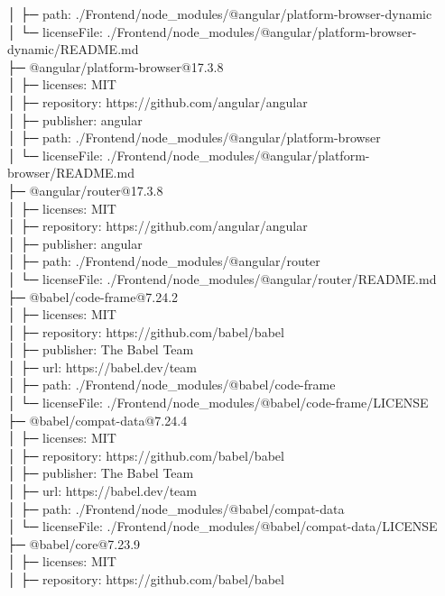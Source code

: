 │  ├─ path: ./Frontend/node\_modules/@angular/platform-browser-dynamic\\
│  └─ licenseFile: ./Frontend/node\_modules/@angular/platform-browser-dynamic/README.md\\
├─ @angular/platform-browser@17.3.8\\
│  ├─ licenses: MIT\\
│  ├─ repository: https://github.com/angular/angular\\
│  ├─ publisher: angular\\
│  ├─ path: ./Frontend/node\_modules/@angular/platform-browser\\
│  └─ licenseFile: ./Frontend/node\_modules/@angular/platform-browser/README.md\\
├─ @angular/router@17.3.8\\
│  ├─ licenses: MIT\\
│  ├─ repository: https://github.com/angular/angular\\
│  ├─ publisher: angular\\
│  ├─ path: ./Frontend/node\_modules/@angular/router\\
│  └─ licenseFile: ./Frontend/node\_modules/@angular/router/README.md\\
├─ @babel/code-frame@7.24.2\\
│  ├─ licenses: MIT\\
│  ├─ repository: https://github.com/babel/babel\\
│  ├─ publisher: The Babel Team\\
│  ├─ url: https://babel.dev/team\\
│  ├─ path: ./Frontend/node\_modules/@babel/code-frame\\
│  └─ licenseFile: ./Frontend/node\_modules/@babel/code-frame/LICENSE\\
├─ @babel/compat-data@7.24.4\\
│  ├─ licenses: MIT\\
│  ├─ repository: https://github.com/babel/babel\\
│  ├─ publisher: The Babel Team\\
│  ├─ url: https://babel.dev/team\\
│  ├─ path: ./Frontend/node\_modules/@babel/compat-data\\
│  └─ licenseFile: ./Frontend/node\_modules/@babel/compat-data/LICENSE\\
├─ @babel/core@7.23.9\\
│  ├─ licenses: MIT\\
│  ├─ repository: https://github.com/babel/babel\\
